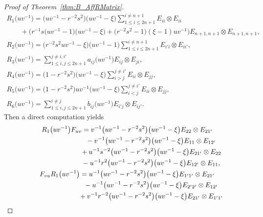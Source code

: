 \documentclass[pdftex]{sigma}
\numberwithin{equation}{section}
\begin{document}
\begin{proof}[Proof of Theorem~\ref{thm:B_AffRMatrix}]
\begin{gather*}
 R_{1}\bigl(uv^{-1}\bigr) = \bigl(uv^{-1} - r^{-2}s^{2}\bigr)\bigl(uv^{-1} - \xi\bigr) \sum_{1 \le i \le 2n + 1}^{i \neq n + 1} E_{ii} \otimes E_{ii} \\
 \qquad{}
 + \bigl(r^{-1}s\bigl(uv^{-1} - 1\bigr)\bigl(uv^{-1} - \xi\bigr) + \bigl(r^{-2}s^{2} - 1\bigr)(\xi - 1)uv^{-1}\bigr)E_{n+1,n + 1} \otimes E_{n+ 1,n + 1}, \\
 R_{2}\bigl(uv^{-1}\bigr) = \bigl(r^{-2}s^{2}uv^{-1} - \xi\bigr)\bigl(uv^{-1} - 1\bigr)\sum_{1 \le i \le 2n + 1}^{i \neq n + 1}E_{i'i} \otimes E_{ii'}, \\
 R_{3}\bigl(uv^{-1}\bigr) = \sum_{1 \le i,j \le 2n + 1}^{j \neq i,i'}a_{ij}\bigl(uv^{-1}\bigr)E_{ij} \otimes E_{ji}, \\
 R_{4}\bigl(uv^{-1}\bigr) = \bigl(1 - r^{-2}s^{2}\bigr)\bigl(uv^{-1} - \xi\bigr)\sum_{i > j}^{j \neq i'}E_{ii} \otimes E_{jj}, \\
 R_{5}\bigl(uv^{-1}\bigr) = \bigl(1 - r^{-2}s^{2}\bigr)uv^{-1}\bigl(uv^{-1} - \xi\bigr)\sum_{i < j}^{j \neq i'}E_{ii} \otimes E_{jj}, \\
 R_{6}\bigl(uv^{-1}\bigr) = \sum_{1 \le i,j \le 2n + 1}^{i \neq j}b_{ij}\bigl(uv^{-1}\bigr)E_{i'j} \otimes E_{ij'}.
\end{gather*}
Then a direct computation yields
\begin{gather*}
 R_{1}\bigl(uv^{-1}\bigr)F_{uv}= v^{-1}\bigl(uv^{-1} - r^{-2}s^{2}\bigr)\bigl(uv^{-1} - \xi\bigr)E_{22} \otimes E_{21'} \\
\hphantom{ R_{1}\bigl(uv^{-1}\bigr)F_{uv}=}{}
- v^{-1}\bigl(uv^{-1} - r^{-2}s^{2}\bigr)\bigl(uv^{-1} - \xi\bigr)E_{11} \otimes E_{12'} \\
\hphantom{ R_{1}\bigl(uv^{-1}\bigr)F_{uv}=}{}
 +u^{-1}s^{-2}\bigl(uv^{-1} - r^{-2}s^{2}\bigr)\bigl(uv^{-1} - \xi\bigr)E_{21'} \otimes E_{22} \\
\hphantom{ R_{1}\bigl(uv^{-1}\bigr)F_{uv}=}{}
 - u^{-1}r^{2}\bigl(uv^{-1} - r^{-2}s^{2}\bigr)\bigl(uv^{-1} - \xi\bigr)E_{12'} \otimes E_{11},
\\
 F_{vu}R_{1}\bigl(uv^{-1}\bigr) = u^{-1}\bigl(uv^{-1} - r^{-2}s^{2}\bigr)\bigl(uv^{-1} - \xi\bigr)E_{1'1'} \otimes E_{21'}\\
 \hphantom{F_{vu}R_{1}\bigl(uv^{-1}\bigr) =}{}
 - u^{-1}\bigl(uv^{-1} - r^{-2}s^{2}\bigr)\bigl(uv^{-1} - \xi\bigr)E_{2'2'} \otimes E_{12'} \\
 \hphantom{F_{vu}R_{1}\bigl(uv^{-1}\bigr) =}{}
 +v^{-1}r^{-2}\bigl(uv^{-1} - r^{-2}s^{2}\bigr)\bigl(uv^{-1} - \xi\bigr)E_{21'} \otimes E_{1'1'} \\

\end{gather*}
\end{proof}
\end{document}
